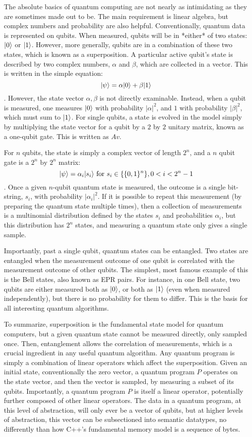 \documentclass[journal]{article}
\DeclarePairedDelimiter\ket{\lvert}{\rangle}
\begin{document}
The absolute basics of quantum computing are not nearly as intimidating as they are sometimes made out to be.
The main requirement is linear algebra, but complex numbers and probability are also helpful. 
Conventionally, quantum data is represented on qubits.
When measured, qubits will be in *either* of two states: $\ket{0}$ or $\ket{1}$.
However, more generally, qubits are in a combination of these two states, which is known as a superposition.
A particular active qubit's state is described by two complex numbers, $\alpha$ and $\beta$, which are collected in a vector.
This is written in the simple equation: $$\ket{\psi} = \alpha\ket{0} + \beta\ket{1}$$.
However, the state vector $\alpha, \beta$ is not directly examinable.
Instead, when a qubit is measured, one measures $\ket{0}$ with probability $|\alpha|^2$, and $1$ with probability $|\beta|^2$, which must sum to $\ket{1}$.
For single qubits, a state is evolved in the model simply by multiplying the state vector for a qubit by a $2$ by $2$ unitary matrix, known as a one-qubit gate. This is written as $Av$.

For $n$ qubits, the state is simply a complex vector of length $2^n$, and a $n$ qubit gate is a $2^n \text{ by } 2^n$ matrix:
$$\ket{\psi} = \alpha_i\ket{s_i} \text{ for } s_i \in \{\{0, 1\}^n\}, 0 < i < 2^n - 1$$.
Once a given $n$-qubit quantum state is measured, the outcome is a single bit-string, $s_i$, with probability $|\alpha_i|^2$.
If it is possible to repeat this measurement (by preparing the quantum state multiple times), then a collection of measurements is a multinomial distribution defined by the states $s_i$ and probabilities $\alpha_i$, but this distribution has $2^n$ states, and measuring a quantum state only gives a single sample.

Importantly, past a single qubit, quantum states can be entangled.
Two states are entangled when the measurement outcome of one qubit is correlated with the measurement outcome of other qubits.
The simplest, most famous example of this is the Bell states, also known as EPR pairs.
For instance, in one Bell state, two qubits are either measured both as $\ket{0}$, or both as $\ket{1}$ (even when measured independently), but there is no probability for them to differ.
This is the basis for all interesting quantum algorithms.

To summarize, superposition is the fundamental state model for quantum computers, but a given quantum state cannot be measured directly, only sampled once.
Then, entanglement allows the correlation of measurements, which is a crucial ingredient in any useful quantum algorithm. 
Any quantum program is simply a combination of linear operators which affect the superposition.
Given an initial state, conventionally the zero vector, a quantum program $P$ operates on the state vector, and then the vector is sampled, by measuring a subset of its qubits.
Importantly, a quantum program $P$ is itself a linear operator, potentially further composed of other linear operators.
The data in a quantum program, at this level of abstraction, will only ever be a vector of qubits, but at higher levels of abstraction, this vector can be subsectioned into semantic datatypes, no differently than how C++'s fundamental memory model is a sequence of bytes.
\end{document}
